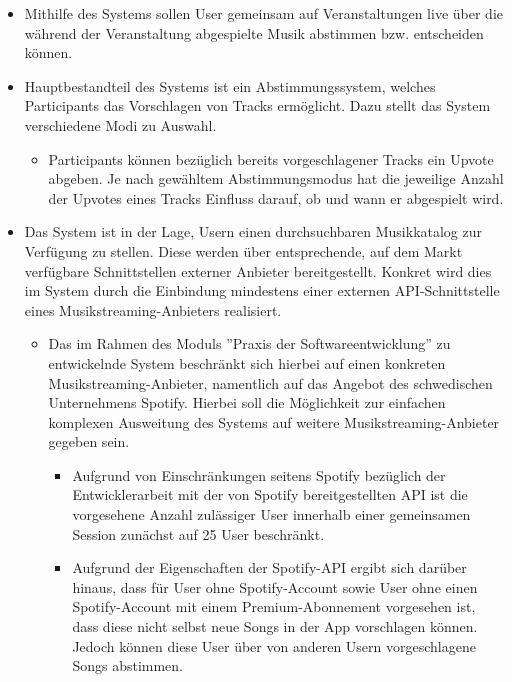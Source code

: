 \documentclass[oneside, ngerman]{sdqtechreport}
\begin{document}
\begin{itemize}
    \item Mithilfe des Systems sollen User gemeinsam auf Veranstaltungen live über die während der Veranstaltung abgespielte Musik abstimmen bzw. entscheiden können.
    \item Hauptbestandteil des Systems ist ein Abstimmungssystem, welches Participants das Vorschlagen von Tracks ermöglicht. Dazu stellt das System verschiedene Modi zu Auswahl.
    \begin{itemize}
        \item Participants können bezüglich bereits vorgeschlagener Tracks ein Upvote abgeben. Je nach gewähltem Abstimmungsmodus hat die jeweilige Anzahl der Upvotes eines Tracks Einfluss darauf, ob und wann er abgespielt wird.
    \end{itemize}
    \item Das System ist in der Lage, Usern einen durchsuchbaren Musikkatalog zur Verfügung zu stellen. Diese werden über entsprechende, auf dem Markt verfügbare Schnittstellen externer Anbieter bereitgestellt. Konkret wird dies im System durch die Einbindung mindestens einer externen API-Schnittstelle eines Musikstreaming-Anbieters realisiert.
    \begin{itemize}
        \item Das im Rahmen des Moduls ''Praxis der Softwareentwicklung'' zu entwickelnde System beschränkt sich hierbei auf einen konkreten Musikstreaming-Anbieter, namentlich auf das Angebot des schwedischen Unternehmens Spotify. Hierbei soll die Möglichkeit zur einfachen komplexen Ausweitung des Systems auf weitere Musikstreaming-Anbieter gegeben sein.
        \begin{itemize}
            \item Aufgrund von Einschränkungen seitens Spotify bezüglich der Entwicklerarbeit mit der von Spotify bereitgestellten API ist die vorgesehene Anzahl zulässiger User innerhalb einer gemeinsamen Session zunächst auf 25 User beschränkt.
            \item Aufgrund der Eigenschaften der Spotify-API ergibt sich darüber hinaus, dass für User ohne Spotify-Account sowie User ohne einen Spotify-Account mit einem Premium-Abonnement vorgesehen ist, dass diese nicht selbst neue Songs in der App vorschlagen können. Jedoch können diese User über von anderen Usern vorgeschlagene Songs abstimmen.
        \end{itemize}


\end{itemize}
\end{itemize}
\end{document}

